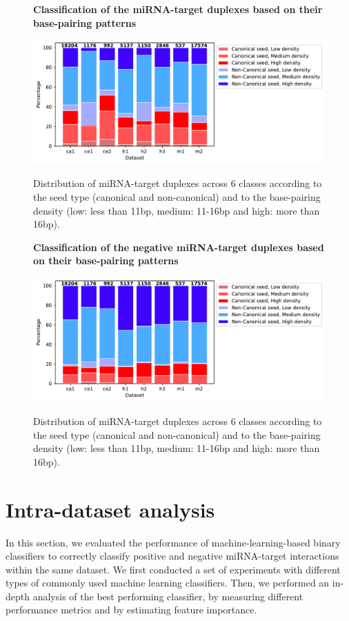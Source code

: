 \begin{figure}[h!]
  \caption{\textbf{Classification of the miRNA-target duplexes based on their base-pairing patterns}} 
    \includegraphics[width = 1\textwidth]{figures/2_seed_type_positive2.pdf}
      \label{fig:seed_type_pos}
      \caption*{Distribution of miRNA-target duplexes across 6 classes according to the seed type (canonical and non-canonical) and to the base-pairing density (low: less than 11bp, medium: 11-16bp and high: more than 16bp).}

      \end{figure}
      

\begin{figure}[h!]
 \centering
  \caption{\textbf{Classification of the negative miRNA-target duplexes based on their base-pairing patterns}}
    \includegraphics[width = 1\textwidth]{figures/seed_type_negative2.pdf}
      \label{fig:seed_type_neg}
      \caption*{Distribution of miRNA-target duplexes across 6 classes according to the seed type (canonical and non-canonical) and to the base-pairing density (low: less than 11bp, medium: 11-16bp and high: more than 16bp).}
      \end{figure}




\section{Intra-dataset analysis} \label{nameref:indataset}
In this section, we evaluated the performance of machine-learning-based binary classifiers to correctly classify positive and negative miRNA-target interactions within the same dataset. 
We first conducted a set of experiments with different types of commonly used machine learning classifiers. Then, we performed an in-depth analysis of the best performing classifier, by measuring different performance metrics and by estimating feature importance.

